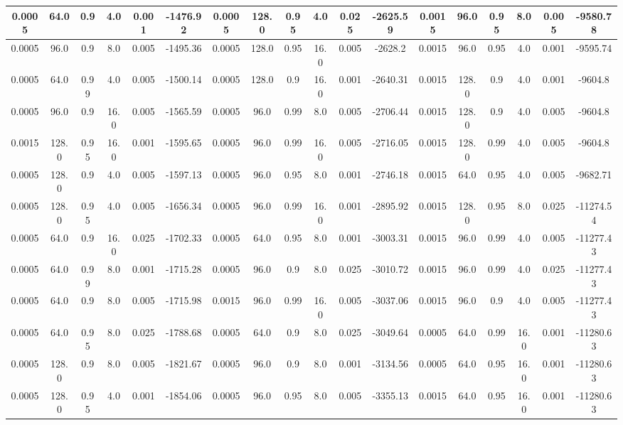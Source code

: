 \begin{table}[h]
\begin{tabular}{|c|c|c|c|c|c||c|c|c|c|c|c||c|c|c|c|c|c|}
    \hline
    0.0005 & 64.0 & 0.9 & 4.0 & 0.001 & -1476.92 & 0.0005 & 128.0 & 0.95 & 4.0 & 0.025 & -2625.59 & 0.0015 & 96.0 & 0.95 & 8.0 & 0.005 & -9580.78 \\
    \hline
    0.0005 & 96.0 & 0.9 & 8.0 & 0.005 & -1495.36 & 0.0005 & 128.0 & 0.95 & 16.0 & 0.005 & -2628.2 & 0.0015 & 96.0 & 0.95 & 4.0 & 0.001 & -9595.74 \\
    \hline
    0.0005 & 64.0 & 0.99 & 4.0 & 0.005 & -1500.14 & 0.0005 & 128.0 & 0.9 & 16.0 & 0.001 & -2640.31 & 0.0015 & 128.0 & 0.9 & 4.0 & 0.001 & -9604.8 \\
    \hline
    0.0005 & 96.0 & 0.9 & 16.0 & 0.005 & -1565.59 & 0.0005 & 96.0 & 0.99 & 8.0 & 0.005 & -2706.44 & 0.0015 & 128.0 & 0.9 & 4.0 & 0.005 & -9604.8 \\
    \hline
    0.0015 & 128.0 & 0.95 & 16.0 & 0.001 & -1595.65 & 0.0005 & 96.0 & 0.99 & 16.0 & 0.005 & -2716.05 & 0.0015 & 128.0 & 0.99 & 4.0 & 0.005 & -9604.8 \\
    \hline
    0.0005 & 128.0 & 0.9 & 4.0 & 0.005 & -1597.13 & 0.0005 & 96.0 & 0.95 & 8.0 & 0.001 & -2746.18 & 0.0015 & 64.0 & 0.95 & 4.0 & 0.005 & -9682.71 \\
    \hline
    0.0005 & 128.0 & 0.95 & 4.0 & 0.005 & -1656.34 & 0.0005 & 96.0 & 0.99 & 16.0 & 0.001 & -2895.92 & 0.0015 & 128.0 & 0.95 & 8.0 & 0.025 & -11274.54 \\
    \hline
    0.0005 & 64.0 & 0.9 & 16.0 & 0.025 & -1702.33 & 0.0005 & 64.0 & 0.95 & 8.0 & 0.001 & -3003.31 & 0.0015 & 96.0 & 0.99 & 4.0 & 0.005 & -11277.43 \\
    \hline
    0.0005 & 64.0 & 0.99 & 8.0 & 0.001 & -1715.28 & 0.0005 & 96.0 & 0.9 & 8.0 & 0.025 & -3010.72 & 0.0015 & 96.0 & 0.99 & 4.0 & 0.025 & -11277.43 \\
    \hline
    0.0005 & 64.0 & 0.9 & 8.0 & 0.005 & -1715.98 & 0.0015 & 96.0 & 0.99 & 16.0 & 0.005 & -3037.06 & 0.0015 & 96.0 & 0.9 & 4.0 & 0.005 & -11277.43 \\
    \hline
    0.0005 & 64.0 & 0.95 & 8.0 & 0.025 & -1788.68 & 0.0005 & 64.0 & 0.9 & 8.0 & 0.025 & -3049.64 & 0.0005 & 64.0 & 0.99 & 16.0 & 0.001 & -11280.63 \\
    \hline
    0.0005 & 128.0 & 0.9 & 8.0 & 0.005 & -1821.67 & 0.0005 & 96.0 & 0.9 & 8.0 & 0.001 & -3134.56 & 0.0005 & 64.0 & 0.95 & 16.0 & 0.001 & -11280.63 \\
    \hline
    0.0005 & 128.0 & 0.95 & 4.0 & 0.001 & -1854.06 & 0.0005 & 96.0 & 0.95 & 8.0 & 0.005 & -3355.13 & 0.0015 & 64.0 & 0.95 & 16.0 & 0.001 & -11280.63 \\

\end{tabular}
\end{table}
